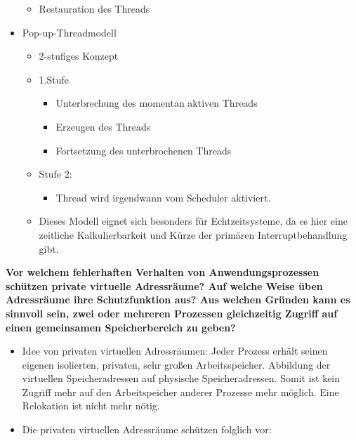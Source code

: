 \documentclass[a4paper]{article}
\begin{document}
\begin{description*}
\begin{itemize}
\begin{itemize}
                  \item Restauration des Threads
              \end{itemize}
        \item Pop-up-Threadmodell
              \begin{itemize}
                  \item 2-stufiges Konzept
                  \item 1.Stufe
                        \begin{itemize}
                            \item Unterbrechung des momentan aktiven Threads
                            \item Erzeugen des Threads
                            \item Fortsetzung des unterbrochenen Threads
                        \end{itemize}
                  \item Stufe 2:
                        \begin{itemize}
                            \item Thread wird irgendwann vom Scheduler aktiviert.
                        \end{itemize}
                  \item Dieses Modell eignet sich besonders für Echtzeitsysteme, da es hier eine zeitliche Kalkulierbarkeit und Kürze der primären Interruptbehandlung gibt.
              \end{itemize}
    \end{itemize}
    \item \textbf{Vor welchem fehlerhaften Verhalten von Anwendungsprozessen schützen private virtuelle Adressräume? Auf welche Weise üben Adressräume ihre Schutzfunktion aus? Aus welchen Gründen kann es sinnvoll sein, zwei oder mehreren Prozessen gleichzeitig Zugriff auf einen gemeinsamen Speicherbereich zu geben?}
    \begin{itemize}
        \item Idee von privaten virtuellen Adressräumen: Jeder Prozess erhält seinen eigenen isolierten, privaten, sehr großen Arbeitsspeicher. Abbildung der virtuellen Speicheradressen auf physische Speicheradressen. Somit ist kein Zugriff mehr auf den Arbeitspeicher anderer Prozesse mehr möglich. Eine Relokation ist nicht mehr nötig.
        \item Die privaten virtuellen Adressräume schützen folglich vor:
              \begin{itemize}

\end{itemize}
\end{itemize}
\end{description*}
\end{document}
